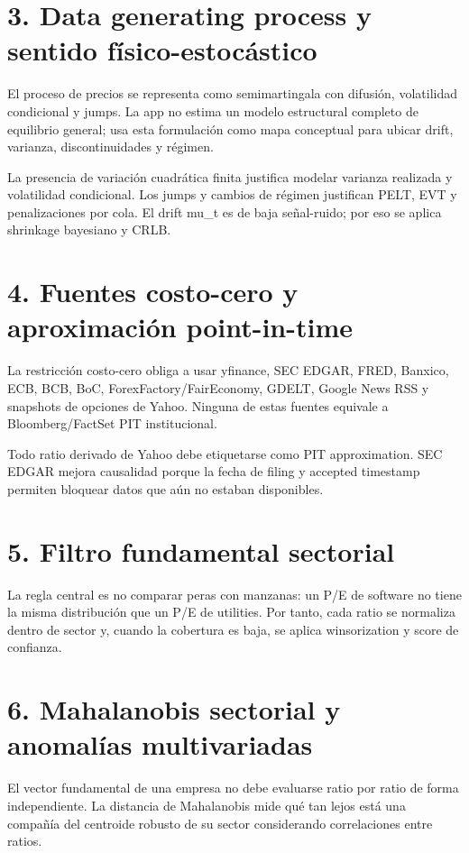 \documentclass[11pt,letterpaper]{article}
\begin{document}
\section{3. Data generating process y sentido físico-estocástico}
El proceso de precios se representa como semimartingala con difusión, volatilidad condicional y jumps. La app no estima un modelo estructural completo de equilibrio general; usa esta formulación como mapa conceptual para ubicar drift, varianza, discontinuidades y régimen.

La presencia de variación cuadrática finita justifica modelar varianza realizada y volatilidad condicional. Los jumps y cambios de régimen justifican PELT, EVT y penalizaciones por cola. El drift mu\_t es de baja señal-ruido; por eso se aplica shrinkage bayesiano y CRLB.

\section{4. Fuentes costo-cero y aproximación point-in-time}
La restricción costo-cero obliga a usar yfinance, SEC EDGAR, FRED, Banxico, ECB, BCB, BoC, ForexFactory/FairEconomy, GDELT, Google News RSS y snapshots de opciones de Yahoo. Ninguna de estas fuentes equivale a Bloomberg/FactSet PIT institucional.

Todo ratio derivado de Yahoo debe etiquetarse como PIT approximation. SEC EDGAR mejora causalidad porque la fecha de filing y accepted timestamp permiten bloquear datos que aún no estaban disponibles.

\section{5. Filtro fundamental sectorial}
La regla central es no comparar peras con manzanas: un P/E de software no tiene la misma distribución que un P/E de utilities. Por tanto, cada ratio se normaliza dentro de sector y, cuando la cobertura es baja, se aplica winsorization y score de confianza.

\section{6. Mahalanobis sectorial y anomalías multivariadas}
El vector fundamental de una empresa no debe evaluarse ratio por ratio de forma independiente. La distancia de Mahalanobis mide qué tan lejos está una compañía del centroide robusto de su sector considerando correlaciones entre ratios.
\end{document}

